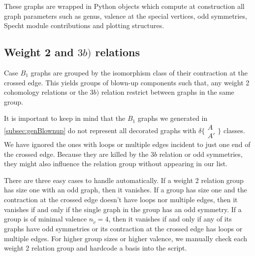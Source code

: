 These graphs are wrapped in Python objects which compute at construction all graph parameters such as genus, valence at the special vertices, odd symmetries, Specht module contributions and plotting structures.

\subsection{Weight 2 and $3b)$ relations} Case $B_1$ graphs are grouped by the isomorphism class of their contraction at the crossed edge.
This yields groups of blown-up components such that, any weight 2 cohomology relations or the $3b)$ relation restrict between graphs in the same group.

It is important to keep in mind that the $B_1$ graphs we generated in \ref{subsec:genBlownup} do not represent all decorated graphs with $\delta\{\substack{A\\A'}\}$ classes. We have ignored the ones with loops or multiple edges incident to just one end of the crossed edge. Because they are killed by the $3b$ relation or odd symmetries, they might also influence the relation group without appearing in our list.

There are three easy cases to handle automatically. If a weight 2 relation group has size one with an odd graph, then it vanishes. If a group has size one and the contraction at the crossed edge doesn't have loops nor multiple edges, then it vanishes if and only if the single graph in the group has an odd symmetry. If a group is of minimal valence $n_{\tilde{v}}=4$, then it vanishes if and only if any of its graphs have odd symmetries or its contraction at the crossed edge has loops or multiple edges. For higher group sizes or higher valence, we manually check each weight 2 relation group and hardcode a basis into the script.

